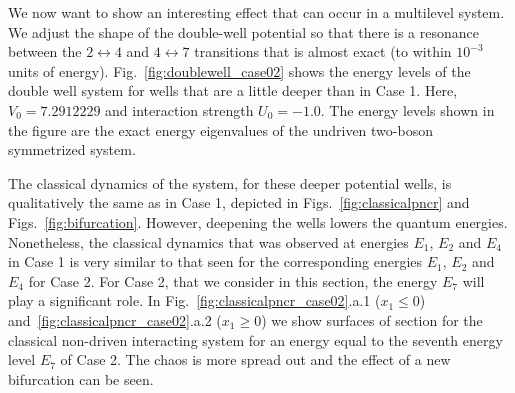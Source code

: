 \documentclass{article}
\begin{document}
We now want to show an interesting effect that can occur in a multilevel system.  We adjust the shape of the double-well potential so that there is a  resonance between the $2 \leftrightarrow 4 $ and $4 \leftrightarrow 7$ transitions that is almost exact (to within $10^{-3}$ units of energy).
Fig.~\ref{fig:doublewell_case02} shows the energy levels of the double well system for wells that are a little deeper than in Case 1.  Here, $V_0 = 7.2912229$ and interaction strength  $U_0 = -1.0$. The energy levels shown in the figure are the exact energy eigenvalues of the undriven two-boson symmetrized system.

The classical dynamics of the system, for these deeper potential wells, is qualitatively the same as in Case 1, depicted in Figs.~\ref{fig:classicalpncr} and Figs.~\ref{fig:bifurcation}. However, deepening the wells  lowers  the quantum energies.  Nonetheless, the classical dynamics that was observed at energies $E_1$, $E_2$ and $E_4$ in Case 1 is very similar to that  seen for the corresponding  energies $E_1$, $E_2$ and $E_4$ for  Case 2.  For Case 2, that we consider in this section, the energy $E_7$ will play a significant role. In Fig.~\ref{fig:classicalpncr_case02}.a.1 ($x_1 \leq 0$) and~\ref{fig:classicalpncr_case02}.a.2 ($x_1 \geq 0$) we show surfaces of section for the classical non-driven interacting system  for an energy equal to the seventh energy level $E_7$ of Case 2.  The chaos is more spread out and the effect of a  new bifurcation can be seen.
\end{document}
